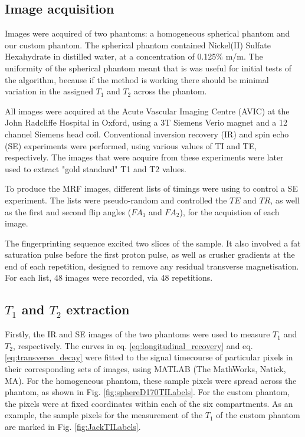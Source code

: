 \documentclass[journal]{IEEEtran}
\begin{document}
\subsection{Image acquisition}

 Images were acquired of two phantoms: a homogeneous spherical phantom and our custom phantom. 
The spherical phantom contained Nickel(II) Sulfate Hexahydrate in distilled water, at a concentration of 0.125\% m/m. The uniformity of the spherical phantom meant that is was useful for initial tests of the algorithm, because if the method is working there should be minimal variation in the assigned $T_1$ and $T_2$ across the phantom.

All images were acquired at the Acute Vascular Imaging Centre (AVIC) at the John Radcliffe Hospital in Oxford, using a 3T Siemens Verio magnet and a 12 channel Siemens head coil. 
Conventional inversion recovery (IR) and spin echo (SE) experiments were performed, using various values of TI and TE, respectively. The images that were acquire from these experiments were later used to extract "gold standard" T1 and T2 values. 

To produce the MRF images, different lists of timings were using to control a SE experiment. The lists were pseudo-random and controlled the $TE$ and $TR$, as well as the first and second flip angles ($FA_1$ and $FA_2$), for the acquistion of each image.

 The fingerprinting sequence excited two slices of the sample. It also involved a fat saturation pulse before the first proton pulse, as well as crusher gradients at the end of each repetition, designed to remove any residual transverse magnetisation.  For each list, 48 images were recorded, via 48 repetitions. 

\subsection{$T_1$ and $T_2$ extraction}
Firstly, the IR and SE images of the two phantoms were used to measure $T_1$ and $T_2$, respectively. The curves in eq. \eqref{eq:longitudinal_recovery} and eq. \eqref{eq:transverse_decay} were fitted to the signal timecourse of particular pixels in their corresponding sets of images, using  MATLAB (The
MathWorks, Natick, MA). For the homogeneous phantom, these sample pixels were spread across the phantom, as shown in Fig. \ref{fig:sphereD170TILabels}. For the custom phantom, the pixels were at fixed coordinates within each of the six compartments. As an example, the sample pixels for the measurement of the $T_1$ of the custom phantom are marked in Fig. \ref{fig:JackTILabels}. 
\end{document}
